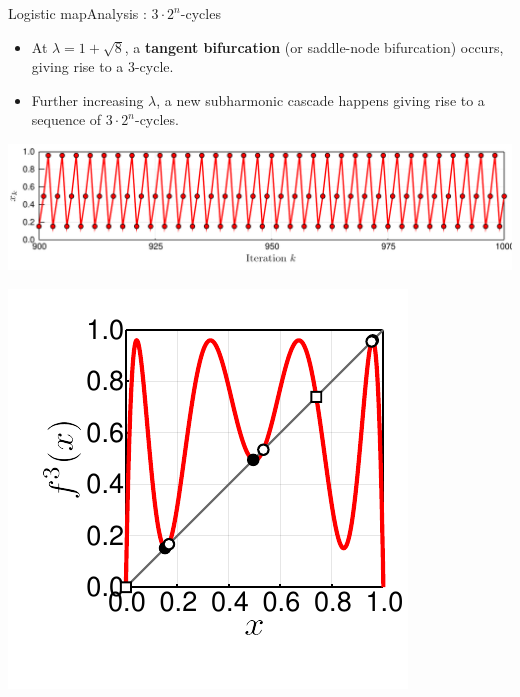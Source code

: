 \documentclass[usenames,dvipsnames,svgnames,10pt,aspectratio=169]{beamer}
\begin{document}
\begin{frame}[t, c]{Logistic map}{Analysis : \( 3 \cdot 2^n \)-cycles}
	\begin{minipage}{.68\textwidth}
		\begin{itemize}
			\item At \( \lambda = 1 + \sqrt{8} \), a \textbf{tangent bifurcation} (or saddle-node bifurcation) occurs, giving rise to a 3-cycle.

			\medskip

			\item Further increasing \( \lambda \), a new subharmonic cascade happens giving rise to a sequence of \(3 \cdot 2^n\)-cycles.
		\end{itemize}

		\bigskip

		\includegraphics[width=\textwidth]{cycle_3_time_series}
	\end{minipage}%
	\hfill
	\begin{minipage}{.28\textwidth}
		\centering
		\includegraphics[width=\textwidth]{cycle_3_creation}
	\end{minipage}

	\vspace{1cm}
\end{frame}
\end{document}
